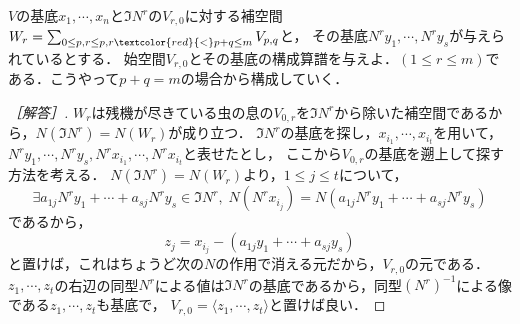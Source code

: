 \documentclass[uplatex, dvipdfmx]{jsreport}
\begin{document}
\begin{problem}
    $V$の基底$x_1,\cdots,x_n$と$\Im N^r$の$V_{r,0}$に対する補空間$W_r=\sum_{0\le p,r\le p,r\textcolor{red}{<}p+q\le m}V_{p,q}$と，
    その基底$N^ry_1,\cdots,N^ry_s$が与えられているとする．
    始空間$V_{r,0}$とその基底の構成算譜を与えよ．$(1\le r\le m)$である．こうやって$p+q=m$の場合から構成していく．
\end{problem}
\begin{proof}[［解答］]
    $W_r$は残機が尽きている虫の息の$V_{0,r}$を$\Im N^r$から除いた補空間であるから，$N(\Im N^r)=N(W_r)$が成り立つ．
    $\Im N^r$の基底を探し，$x_{i_1},\cdots,x_{i_t}$を用いて，$N^ry_1,\cdots,N^ry_s,N^rx_{i_1},\cdots,N^rx_{i_t}$と表せたとし，
    ここから$V_{0,r}$の基底を遡上して探す方法を考える．
    $N(\Im N^r)=N(W_r)$より，$1\le j\le t$について，
    \[ \exists a_{1j}N^ry_1+\cdots+a_{sj}N^ry_s\in\Im N^r,\; N(N^{r}x_{i_j})=N(a_{1j}N^ry_1+\cdots+a_{sj}N^ry_s) \]
    であるから，
    \[ z_j=x_{i_j}-(a_{1j}y_1+\cdots+a_{sj}y_s) \]
    と置けば，これはちょうど次の$N$の作用で消える元だから，$V_{r,0}$の元である．
    $z_1,\cdots,z_t$の右辺の同型$N^r$による値は$\Im N^r$の基底であるから，同型$(N^r)^{-1}$による像である$z_1,\cdots,z_t$も基底で，
    $V_{r,0}=\langle z_1,\cdots,z_t\rangle$と置けば良い．
\end{proof}
\end{document}
